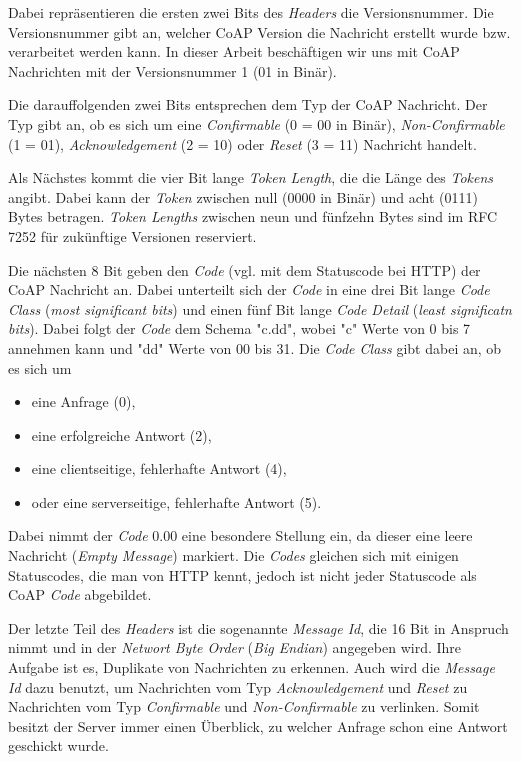 Dabei repräsentieren die ersten zwei Bits des \textit{Headers} die Versionsnummer. Die Versionsnummer gibt an, welcher CoAP Version die Nachricht erstellt wurde bzw. verarbeitet werden kann. In dieser Arbeit beschäftigen wir uns mit CoAP Nachrichten mit der Versionsnummer 1 (01 in Binär).

Die darauffolgenden zwei Bits entsprechen dem Typ der CoAP Nachricht. Der Typ gibt an, ob es sich um eine \textit{Confirmable} (0 = 00 in Binär), \textit{Non-Confirmable} (1 = 01), \textit{Acknowledgement}  (2 = 10) oder \textit{Reset} (3 = 11) Nachricht handelt.

Als Nächstes kommt die vier Bit lange \textit{Token Length}, die die Länge des \textit{Tokens} angibt. Dabei kann der \textit{Token} zwischen null (0000 in Binär) und acht (0111) Bytes betragen. \textit{Token Lengths} zwischen neun und fünfzehn Bytes sind im RFC 7252 \autocite{RFC7252} für zukünftige Versionen reserviert.

Die nächsten 8 Bit geben den \textit{Code} (vgl. mit dem Statuscode bei HTTP) der CoAP Nachricht an. Dabei unterteilt sich der \textit{Code} in eine drei Bit lange \textit{Code Class} (\textit{most significant bits}) und einen fünf Bit lange \textit{Code Detail} (\textit{least significatn bits}). Dabei folgt der \textit{Code} dem Schema "c.dd", wobei "c" Werte von 0 bis 7 annehmen kann und "dd" Werte von 00 bis 31. Die \textit{Code Class} gibt dabei an, ob es sich um
\begin{itemize}
    \item eine Anfrage (0),
    \item eine erfolgreiche Antwort (2),
    \item eine clientseitige, fehlerhafte Antwort (4),
    \item oder eine serverseitige, fehlerhafte Antwort (5).
\end{itemize}

Dabei nimmt der \textit{Code} 0.00 eine besondere Stellung ein, da dieser eine leere Nachricht (\textit{Empty Message}) markiert. Die \textit{Codes} gleichen sich mit einigen Statuscodes, die man von HTTP kennt, jedoch ist nicht jeder Statuscode als CoAP \textit{Code} abgebildet.

Der letzte Teil des \textit{Headers} ist die sogenannte \textit{Message Id}, die 16 Bit in Anspruch nimmt und in der \textit{Networt Byte Order} (\textit{Big Endian}) angegeben wird. Ihre Aufgabe ist es, Duplikate von Nachrichten zu erkennen. Auch wird die \textit{Message Id} dazu benutzt, um Nachrichten vom Typ \textit{Acknowledgement} und \textit{Reset} zu Nachrichten vom Typ \textit{Confirmable} und \textit{Non-Confirmable} zu verlinken. Somit besitzt der Server immer einen Überblick, zu welcher Anfrage schon eine Antwort geschickt wurde.

